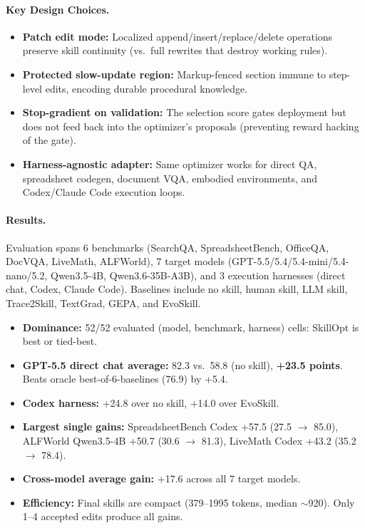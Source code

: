 \documentclass[11pt,a4paper]{article}
\begin{document}
\paragraph{Key Design Choices.}
\begin{itemize}[nosep]
    \item \textbf{Patch edit mode:} Localized append/insert/replace/delete operations preserve skill continuity (vs.\ full rewrites that destroy working rules).
    \item \textbf{Protected slow-update region:} Markup-fenced section immune to step-level edits, encoding durable procedural knowledge.
    \item \textbf{Stop-gradient on validation:} The selection score gates deployment but does not feed back into the optimizer's proposals (preventing reward hacking of the gate).
    \item \textbf{Harness-agnostic adapter:} Same optimizer works for direct QA, spreadsheet codegen, document VQA, embodied environments, and Codex/Claude Code execution loops.
\end{itemize}

\paragraph{Results.}
Evaluation spans 6 benchmarks (SearchQA, SpreadsheetBench, OfficeQA, DocVQA, LiveMath, ALFWorld), 7 target models (GPT-5.5/5.4/5.4-mini/5.4-nano/5.2, Qwen3.5-4B, Qwen3.6-35B-A3B), and 3 execution harnesses (direct chat, Codex, Claude Code). Baselines include no skill, human skill, LLM skill, Trace2Skill, TextGrad, GEPA, and EvoSkill.

\begin{itemize}[nosep]
    \item \textbf{Dominance:} 52/52 evaluated (model, benchmark, harness) cells: SkillOpt is best or tied-best.
    \item \textbf{GPT-5.5 direct chat average:} 82.3 vs.\ 58.8 (no skill), \textbf{+23.5 points}. Beats oracle best-of-6-baselines (76.9) by +5.4.
    \item \textbf{Codex harness:} +24.8 over no skill, +14.0 over EvoSkill.
    \item \textbf{Largest single gains:} SpreadsheetBench Codex +57.5 (27.5 $\to$ 85.0), ALFWorld Qwen3.5-4B +50.7 (30.6 $\to$ 81.3), LiveMath Codex +43.2 (35.2 $\to$ 78.4).
    \item \textbf{Cross-model average gain:} +17.6 across all 7 target models.
    \item \textbf{Efficiency:} Final skills are compact (379--1995 tokens, median $\sim$920). Only 1--4 accepted edits produce all gains.
\end{itemize}
\end{document}
